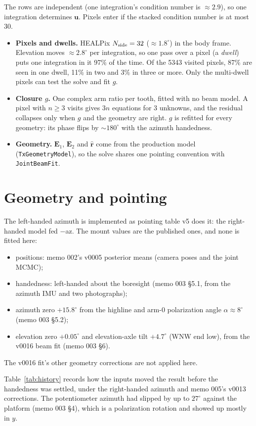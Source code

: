 \documentclass{aastex631}
\newcommand{\vu}{\mathbf{u}}
\newcommand{\vE}{\mathbf{E}}
\newcommand{\rhat}{\hat{\mathbf{r}}}
\begin{document}
The rows are independent (one integration's condition number is $\approx2.9$), so one integration determines
$\vu$. Pixels enter if the stacked condition number is at most 30.
\begin{itemize}
\item \textbf{Pixels and dwells.} HEALPix $N_{\rm side}=32$ ($\approx1.8^\circ$) in the body frame. Elevation
  moves $\approx2.8^\circ$ per integration, so one pass over a pixel (a \emph{dwell}) puts one integration in it
  97\% of the time. Of the 5343 visited pixels, 87\% are seen in one dwell, 11\% in two and 3\% in three or more.
  Only the multi-dwell pixels can test the solve and fit $g$.
\item \textbf{Closure $g$.} One complex arm ratio per tooth, fitted with no beam model. A pixel with $n\ge3$ visits
  gives $3n$ equations for 3 unknowns, and the residual collapses only when $g$ and the geometry are right.
  $g$ is refitted for every geometry: its phase flips by $\sim180^\circ$ with the azimuth handedness.
\item \textbf{Geometry.} $\vE_1$, $\vE_2$ and $\rhat$ come from the production model
  (\texttt{TxGeometryModel}), so the solve shares one pointing convention with \texttt{JointBeamFit}.
\end{itemize}

\section{Geometry and pointing} \label{sec:geometry}
The left-handed azimuth is implemented as pointing table v5 does it: the right-handed model fed $-$az. The mount
values are the published ones, and none is fitted here:
\begin{itemize}
\item positions: memo 002's v0005 posterior means (camera poses and the joint MCMC);
\item handedness: left-handed about the boresight (memo 003 \S5.1, from the azimuth IMU and two photographs);
\item azimuth zero $+15.8^\circ$ from the highline and arm-0 polarization angle $\alpha\approx8^\circ$
  (memo 003 \S5.2);
\item elevation zero $+0.05^\circ$ and elevation-axle tilt $+4.7^\circ$ (WNW end low), from the v0016 beam fit
  (memo 003 \S6).
\end{itemize}
The v0016 fit's other geometry corrections are not applied here.

Table~\ref{tab:history} records how the inputs moved the result before the handedness was settled, under the
right-handed azimuth and memo 005's v0013 corrections. The potentiometer azimuth had slipped by up to $27^\circ$
against the platform (memo 003 \S4), which is a polarization rotation and showed up mostly in $y$.
\end{document}
